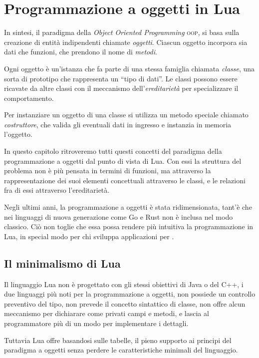 
\chapter{Programmazione a oggetti in Lua}
\label{iChOop}

In sintesi, il paradigma della \emph{Object Oriented Programming} \textsc{oop},
si basa sulla creazione di entità indipendenti chiamate \emph{oggetti}. Ciascun
oggetto incorpora sia dati che funzioni, che prendono il nome di \emph{metodi}.

Ogni oggetto è un'istanza che fa parte di una stessa famiglia chiamata
\emph{classe}, una sorta di prototipo che rappresenta un ``tipo di dati''. Le
classi possono essere ricavate da altre classi con il meccanismo
dell'\emph{ereditarietà} per specializzare il comportamento.

Per instanziare un oggetto di una classe si utilizza un metodo speciale chiamato
\emph{costruttore}, che valida gli eventuali dati in ingresso e instanzia in
memoria l'oggetto.

In questo capitolo ritroveremo tutti questi concetti del paradigma della
programmazione a oggetti dal punto di vista di Lua. Con essi la struttura del
problema non è più pensata in termini di funzioni, ma attraverso la
rappresentazione dei suoi elementi concettuali attraverso le classi, e le
relazioni fra di essi attraverso l'ereditarietà.

Negli ultimi anni, la programmazione a oggetti è stata ridimensionata, tant'è
che nei linguaggi di nuova generazione come Go e Rust non è inclusa nel modo
classico. Ciò non toglie che essa possa rendere più intuitiva la programmazione
in Lua, in special modo per chi sviluppa applicazioni per \LuaTeX.


\section{Il minimalismo di Lua}

Il linguaggio Lua non è progettato con gli stessi obiettivi di Java o del C++,
i due linguaggi più noti per la programmazione a oggetti, non possiede un
controllo preventivo del tipo, non prevede il concetto sintattico di
classe, non offre alcun meccanismo per dichiarare come privati campi e metodi,
e lascia al programmatore più di un modo per implementare i dettagli.

Tuttavia Lua offre basandosi sulle tabelle, il pieno supporto ai principi del
paradigma a oggetti senza perdere le caratteristiche minimali del linguaggio.


